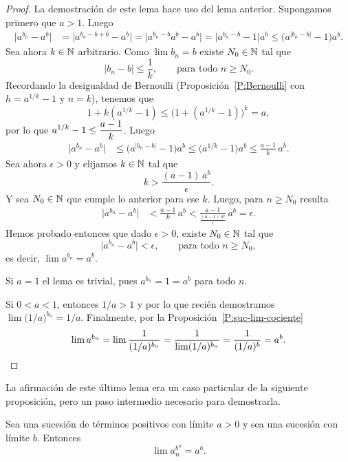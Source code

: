 \begin{proof}
    La demostración de este lema hace uso del lema anterior. Supongamos primero que $a>1$. Luego
    \begin{align*}
        \big| a^{b_n} - a^b \big| 
        &= \big| a^{b_n-b+b} - a^b \big| 
        = \big| a^{b_n-b} a^b - a^b \big| 
        = \big| a^{b_n-b} - 1 \big| a^b
        \le \big( a^{|b_n-b|} - 1 \big) a^b.
    \end{align*}
    Sea ahora $k\in\mathbb{N}$ arbitrario. Como $\lim b_n = b$ existe $N_0\in\mathbb{N}$ tal que 
    \[
    |b_n-b|\le \frac1k,\qquad\text{para todo $n\ge N_0$}.
    \]
    Recordando la desigualdad de Bernoulli (Proposición~\ref{P:Bernoulli} con $h=a^{1/k}-1$ y $n=k$), tenemos que
    \[
    1 + k (a^{1/k}-1) \le \big(1 + (a^{1/k}-1)\big)^k = a,
    \]
    por lo que $\displaystyle a^{1/k}-1 \le \frac{a-1}k$.
    Luego
    \begin{align*}
        \big| a^{b_n} - a^b \big| 
        &\le \big( a^{|b_n-b|} - 1 \big) a^b
        \le  \big( a^{1/k} - 1 \big) a^b 
        \le \frac{a-1}k \, a^b.
    \end{align*}
    Sea ahora $\epsilon > 0$ y elijamos $k \in \mathbb{N}$ tal que 
    \[
    k > \frac{(a-1)\, a^b}{\epsilon}.
    \]
    Y sea $N_0\in\mathbb{N}$ que cumple lo anterior para ese $k$. Luego, para $n\ge N_0$ resulta
    \begin{align*}
        \big| a^{b_n} - a^b \big| 
        &< \frac{a-1}k \, a^b < \frac{a-1}{\frac{(a-1)\, a^b}{\epsilon}} \, a^b
        = \epsilon.
    \end{align*}    
    Hemos probado entonces que dado $\epsilon>0$, existe $N_0\in\mathbb{N}$ tal que
    \[
        \big| a^{b_n} - a^b \big| < \epsilon, \qquad\text{para todo $n\ge N_0$},
    \]
    es decir, $\lim a^{b_n} = a^b$. 

    Si $a=1$ el lema es trivial, pues $a^{b_n} = 1 = a^b$ para todo $n$.

    Si $0<a<1$, entonces $1/a>1$ y por lo que recién demostramos
    $\lim\big( 1/a \big)^{b_n} = 1/a$.
    Finalmente, por la Proposición~\ref{P:suc-lim-cociente}
    \[
    \lim a^{b_n} = \lim \frac{1}{(1/a)^{b_n}} = \frac{1}{\lim (1/a)^{b_n}}
     = \frac{1}{(1/a)^b} = a^b. \qedhere
    \] 
\end{proof}

La afirmación de este último lema era un caso particular de la siguiente proposición, pero un paso intermedio necesario para demostrarla.

\begin{proposition}\label{P:potencias continuas}
    Sea \sucan una sucesión de términos positivos con límite $a>0$ y sea \sucbn una sucesión con límite $b$. Entonces
    \[
    \lim a_n^{b^n} = a^b.
    \]
\end{proposition}

